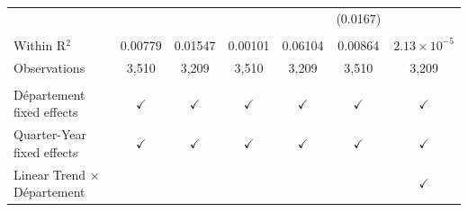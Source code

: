 \begin{table}[htbp]
\begin{tabular}{lcccccc}
                                             &               &                &               &                & (0.0167)      &   \\   
       \\
      Within R$^2$                           & 0.00779       & 0.01547        & 0.00101       & 0.06104        & 0.00864       & $2.13\times 10^{-5}$\\   
      Observations                           & 3,510         & 3,209          & 3,510         & 3,209          & 3,510         & 3,209\\  
       \\
      D\'epartement fixed effects            & $\checkmark$  & $\checkmark$   & $\checkmark$  & $\checkmark$   & $\checkmark$  & $\checkmark$\\   
      Quarter-Year fixed effects             & $\checkmark$  & $\checkmark$   & $\checkmark$  & $\checkmark$   & $\checkmark$  & $\checkmark$\\   
      Linear Trend $\times $ D\'epartement   &               &                &               &                &               & $\checkmark$\\   
      \bottomrule
   \end{tabular}
\end{table}


